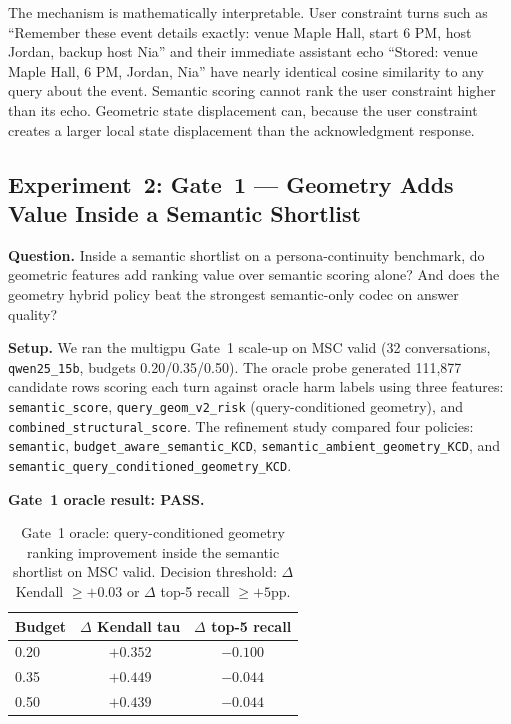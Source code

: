 \documentclass[conference]{IEEEtran}
\begin{document}
The mechanism is mathematically interpretable. User constraint turns such as ``Remember these event details exactly: venue Maple Hall, start 6 PM, host Jordan, backup host Nia'' and their immediate assistant echo ``Stored: venue Maple Hall, 6 PM, Jordan, Nia'' have nearly identical cosine similarity to any query about the event. Semantic scoring cannot rank the user constraint higher than its echo. Geometric state displacement can, because the user constraint creates a larger local state displacement than the acknowledgment response.

\subsection{Experiment~2: Gate~1 --- Geometry Adds Value Inside a Semantic Shortlist}
\label{sec:gate1}
\textbf{Question.} Inside a semantic shortlist on a persona-continuity benchmark, do geometric features add ranking value over semantic scoring alone? And does the geometry hybrid policy beat the strongest semantic-only codec on answer quality?

\textbf{Setup.} We ran the multigpu Gate~1 scale-up on MSC valid (32 conversations, \texttt{qwen25\_15b}, budgets 0.20/0.35/0.50). The oracle probe generated 111{,}877 candidate rows scoring each turn against oracle harm labels using three features: \texttt{semantic\_score}, \texttt{query\_geom\_v2\_risk} (query-conditioned geometry), and \texttt{combined\_structural\_score}. The refinement study compared four policies: \texttt{semantic}, \texttt{budget\_aware\_semantic\_KCD}, \texttt{semantic\_ambient\_geometry\_KCD}, and \texttt{semantic\_query\_conditioned\_geometry\_KCD}.

\textbf{Gate~1 oracle result: PASS.}

\begin{table}[t]
    \centering
    \caption{Gate~1 oracle: query-conditioned geometry ranking improvement inside the semantic shortlist on MSC valid. Decision threshold: $\Delta$ Kendall $\geq +0.03$ or $\Delta$ top-5 recall $\geq +5$pp.}
    \label{tab:gate1_oracle}
    \begin{tabular}{lcc}
        \toprule
        Budget & $\Delta$ Kendall tau & $\Delta$ top-5 recall \\
        \midrule
        0.20 & $+0.352$ & $-0.100$ \\
        0.35 & $+0.449$ & $-0.044$ \\
        0.50 & $+0.439$ & $-0.044$ \\
        \bottomrule
    \end{tabular}
\end{table}
\end{document}
